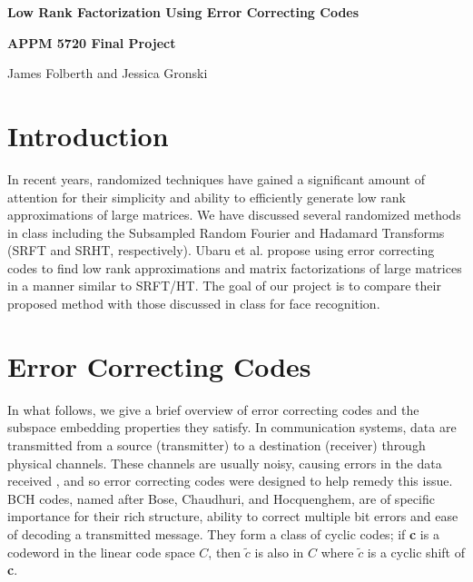 \documentclass[12pt]{article}
\newcommand{\tbf}{\textbf}
\begin{document}
\flushleft

\centerline{\large \bf Low Rank Factorization Using Error Correcting Codes}
\centerline{\large \bf APPM 5720 Final Project}
\vspace{\baselineskip}
{\large \centerline{James Folberth and Jessica Gronski}}
\vspace{\baselineskip}

\section{Introduction}
In recent years, randomized techniques have gained a significant amount of attention for their simplicity and ability to efficiently generate low rank approximations of large matrices. We have discussed several randomized methods in class including the Subsampled Random Fourier and Hadamard Transforms (SRFT and SRHT, respectively). Ubaru et al. \cite{ubaru2015low} propose using error correcting codes to find low rank approximations and matrix factorizations of large matrices in a manner similar to SRFT/HT. The goal of our project is to compare their proposed method with those discussed in class for face recognition. 

\section{Error Correcting Codes}
In what follows, we give a brief overview of error correcting codes and the subspace embedding properties they satisfy. In communication systems, data are transmitted from a source (transmitter) to a destination (receiver) through physical channels. These channels are usually noisy, causing errors in the data received \cite{ubaru2015low}, and so error correcting codes were designed to help remedy this issue. BCH codes, named after  Bose, Chaudhuri, and Hocquenghem, are of specific importance for their rich structure, ability to correct multiple bit errors and ease of decoding a transmitted message. They form a class of cyclic codes; if \tbf{c} is a codeword in the linear code space $C$, then \tbf{$\tilde{c}$} is also in $C$ where \tbf{$\tilde{c}$} is a cyclic shift of \tbf{c}. 

\vspace{3mm}
\end{document}
